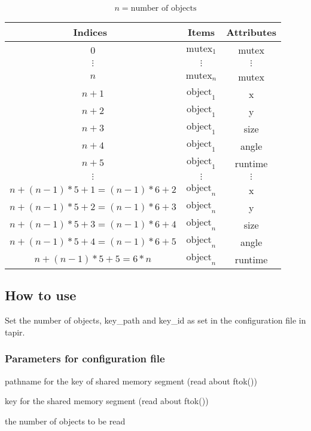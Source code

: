 \begin{displaymath}
    n = \mbox{number of objects}
\end{displaymath}
\begin{center}
\begin{tabular}{c|c|c}
\label{tab:mosmc:ms}
   {\bf Indices }   & {\bf Items }  & {\bf Attributes} \\ \hline
   0                & $\mbox{mutex}_1$  & mutex \\ \hline
   $\vdots$         & $\vdots$          & $\vdots$      \\ \hline  
   $n$              & $\mbox{mutex}_n$  & mutex \\ \hline
   $n+1$            & $\mbox{object}_1$ & x \\ \hline
   $n+2$            & $\mbox{object}_1$ & y \\ \hline
   $n+3$            & $\mbox{object}_1$ & size \\ \hline 
   $n+4$            & $\mbox{object}_1$ & angle \\ \hline
   $n+5$            & $\mbox{object}_1$ & runtime \\ \hline
   $\vdots$         & $\vdots$ & $\vdots$ \\ \hline
   $n + (n-1)*5 +1 = (n-1)*6+2 $ & $\mbox{object}_n$ & x \\ \hline
   $n + (n-1)*5 +2 = (n-1)*6+3$ & $\mbox{object}_n$ & y \\ \hline
   $n + (n-1)*5 +3 = (n-1)*6+4$ & $\mbox{object}_n$ & size \\ \hline 
   $n + (n-1)*5 +4 = (n-1)*6+5$ & $\mbox{object}_n$ & angle \\ \hline
   $n + (n-1)*5 +5 = 6*n$ & $\mbox{object}_n$ & runtime
\end{tabular}
\end{center}

\subsection{How to use}
\label{sec:mosmc:howto}

Set the number of objects, key\_path and key\_id as set in the 
configuration file in tapir.

\subsubsection{Parameters for configuration file}
\label{sec:mosmc:howto:params}

    \begin{description} \itemindent=-15pt
        \item[key\_path] pathname for the key of shared memory segment 
                (read about ftok())
        \item[key\_id] key for the shared memory segment (read about ftok())
        \item[nb\_objects] the number of objects to be read
    \end{description}
